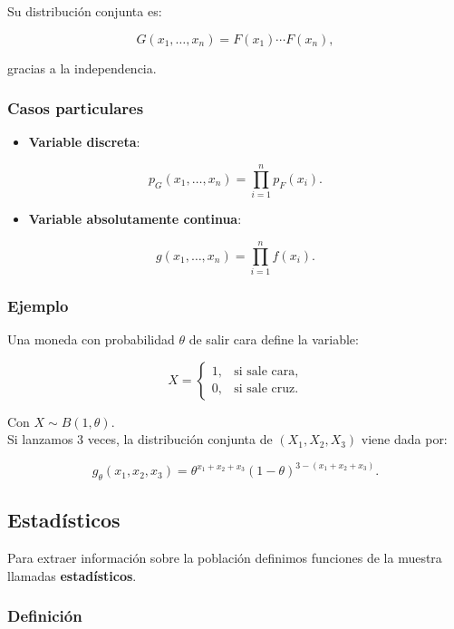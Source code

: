 \documentclass[
]{article}
\providecommand{\tightlist}{%
  \setlength{\itemsep}{0pt}\setlength{\parskip}{0pt}}
\begin{document}
Su distribución conjunta es:

\[
G(x_1,\ldots,x_n) = F(x_1)\cdots F(x_n),
\]

gracias a la independencia.

\subsubsection{Casos particulares}\label{casos-particulares}

\begin{itemize}
\tightlist
\item
  \textbf{Variable discreta}:
\end{itemize}

\[
p_G(x_1,\ldots,x_n)=\prod_{i=1}^n p_F(x_i).
\]

\begin{itemize}
\tightlist
\item
  \textbf{Variable absolutamente continua}:
\end{itemize}

\[
g(x_1,\ldots,x_n)=\prod_{i=1}^n f(x_i).
\]

\subsubsection{Ejemplo}\label{ejemplo-5}

Una moneda con probabilidad \(\theta\) de salir cara define la variable:

\[
X =
\begin{cases}
1,& \text{si sale cara},\\
0,& \text{si sale cruz.}
\end{cases}
\]

Con \(X\sim B(1,\theta)\).\\
Si lanzamos 3 veces, la distribución conjunta de \((X_1,X_2,X_3)\) viene dada por:

\[
g_\theta(x_1,x_2,x_3)
= \theta^{x_1+x_2+x_3}(1-\theta)^{3-(x_1+x_2+x_3)}.
\]

\subsection{Estadísticos}\label{estaduxedsticos}

Para extraer información sobre la población definimos funciones de la muestra llamadas \textbf{estadísticos}.

\subsubsection{Definición}\label{definiciuxf3n}
\end{document}
